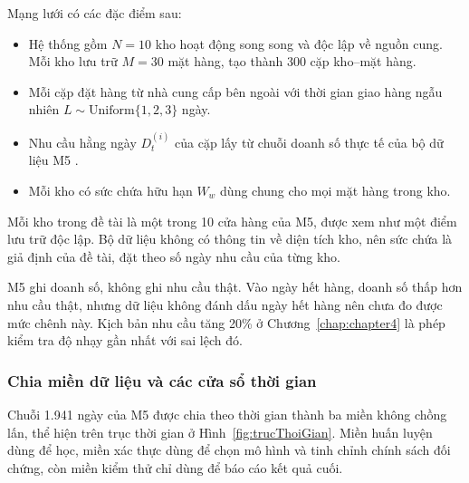 Mạng lưới có các đặc điểm sau:
\begin{itemize}
    \item Hệ thống gồm $N = 10$ kho hoạt động song song và độc lập về nguồn cung. Mỗi kho lưu trữ $M = 30$ mặt hàng, tạo thành 300 cặp kho--mặt hàng.
    \item Mỗi cặp đặt hàng từ nhà cung cấp bên ngoài với thời gian giao hàng ngẫu nhiên $L \sim \mathrm{Uniform}\{1, 2, 3\}$ ngày.
    \item Nhu cầu hằng ngày $D_t^{(i)}$ của cặp lấy từ chuỗi doanh số thực tế của bộ dữ liệu M5 \parencite{makridakis2022background}.
    \item Mỗi kho có sức chứa hữu hạn $W_w$ dùng chung cho mọi mặt hàng trong kho.
\end{itemize}

Mỗi kho trong đề tài là một trong 10 cửa hàng của M5, được xem như một điểm lưu trữ độc lập. Bộ dữ liệu không có thông tin về diện tích kho, nên sức chứa là giả định của đề tài, đặt theo số ngày nhu cầu của từng kho.

M5 ghi doanh số, không ghi nhu cầu thật. Vào ngày hết hàng, doanh số thấp hơn nhu cầu thật, nhưng dữ liệu không đánh dấu ngày hết hàng nên chưa đo được mức chênh này. Kịch bản nhu cầu tăng 20\% ở Chương~\ref{chap:chapter4} là phép kiểm tra độ nhạy gần nhất với sai lệch đó.

\subsubsection{Chia miền dữ liệu và các cửa sổ thời gian}

Chuỗi 1.941 ngày của M5 được chia theo thời gian thành ba miền không chồng lấn, thể hiện trên trục thời gian ở Hình~\ref{fig:trucThoiGian}. Miền huấn luyện dùng để học, miền xác thực dùng để chọn mô hình và tinh chỉnh chính sách đối chứng, còn miền kiểm thử chỉ dùng để báo cáo kết quả cuối.

